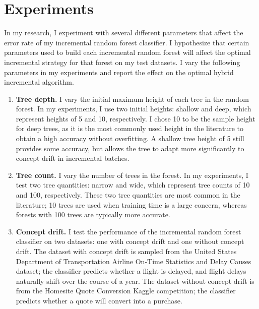 
\section{Experiments}

In my research, I experiment with several different parameters that affect the
error rate of my incremental random forest classifier. I hypothesize that
certain parameters used to build each incremental random forest will affect the
optimal incremental strategy for that forest on my test datasets. I vary the
following parameters in my experiments and report the effect on the optimal
hybrid incremental algorithm.

\begin{enumerate}

    \item \textbf{Tree depth.} I vary the initial maximum height of each tree
      in the random forest. In my experiments, I use two initial heights:
      shallow and deep, which represent heights of 5 and 10, respectively. I
      chose 10 to be the sample height for deep trees, as it is the most
      commonly used height in the literature to obtain a high accuracy without
      overfitting. A shallow tree height of 5 still provides some accuracy, but
      allows the tree to adapt more significantly to concept drift in
      incremental batches. 

    \item \textbf{Tree count.} I vary the number of trees in the forest. In my
      experiments, I test two tree quantities: narrow and wide, which represent
      tree counts of 10 and 100, respectively. These two tree quantities are
      most common in the literature; 10 trees are used when training time is a
      large concern, whereas forests with 100 trees are typically more
      accurate.

    \item \textbf{Concept drift.} I test the performance of the incremental
      random forest classifier on two datasets: one with concept drift and one
      without concept drift. The dataset with concept drift is sampled from the
      United States Department of Transportation Airline On-Time Statistics and
      Delay Causes dataset; the classifier predicts whether a flight is
      delayed, and flight delays naturally shift over the course of a year.
      \cite{Plane} The dataset without concept drift is from the Homesite Quote
      Conversion Kaggle competition; the classifier predicts whether a quote
      will convert into a purchase. \cite{Homesite}

\end{enumerate}

